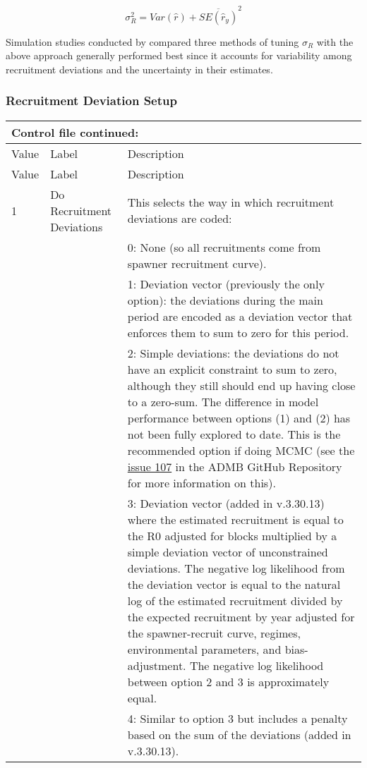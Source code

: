 \begin{equation}
	\sigma_R^2 = Var(\hat{r}) + \overline{SE(\hat{r}_y)}^2
\end{equation}

Simulation studies conducted by \citet{methot-adjusting-2011} compared three methods of tuning $\sigma_R$ with the above approach generally performed best since it accounts for variability among recruitment deviations and the uncertainty in their estimates.

\subsubsection{Recruitment Deviation Setup}
\begin{longtable}{p{1cm} p{3cm} p{11cm}}
	\multicolumn{3}{l}{Control file continued:} \\

	\hline
	Value & Label & Description \Tstrut\Bstrut\\
	\hline
	\endfirsthead

	\hline
	Value & Label & Description \Tstrut\Bstrut\\
	\hline
	\endhead
	\hline
	\endfoot
	\endlastfoot


	1 \Tstrut & Do Recruitment Deviations & This selects the way in which recruitment deviations are coded: \\
	  & & 0: None (so all recruitments come from spawner recruitment curve). \\
	  & & 1: Deviation vector (previously the only option): the deviations during the main period are encoded as a deviation vector that enforces them to sum to zero for this period. \\
	  & & 2: Simple deviations: the deviations do not have an explicit constraint to sum to zero, although they still should end up having close to a zero-sum. The difference in model performance between options (1) and (2) has not been fully explored to date. This is the recommended option if doing MCMC (see the \href{https://github.com/admb-project/admb/issues/107}{issue 107} in the ADMB GitHub Repository for more information on this). \\
	  & & 3: Deviation vector (added in v.3.30.13) where the estimated recruitment is equal to the R0 adjusted for blocks multiplied by a simple deviation vector of unconstrained deviations. The negative log likelihood from the deviation vector is equal to the natural log of the estimated recruitment divided by the expected recruitment by year adjusted for the spawner-recruit curve, regimes, environmental parameters, and bias-adjustment. The negative log likelihood between option 2 and 3 is approximately equal. \\
	  & & 4: Similar to option 3 but includes a penalty based on the sum of the deviations (added in v.3.30.13). \\
	\hline


\end{longtable}
